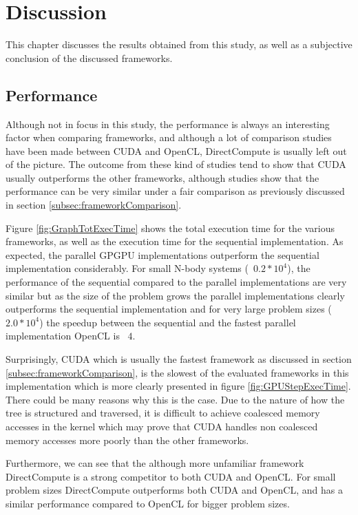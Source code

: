 
\chapter{Discussion}
This chapter discusses the results obtained from this study, as well as a subjective conclusion of the discussed frameworks.

\section{Performance} \label{sec:DiscussionPerformance}
Although not in focus in this study, the performance is always an interesting factor when comparing frameworks, and although a lot of comparison studies have been made between CUDA and OpenCL, DirectCompute is usually left out of the picture. The outcome from these kind of studies tend to show that CUDA usually outperforms the other frameworks, although studies show that the performance can be very similar under a fair comparison as previously discussed in section \ref{subsec:frameworkComparison}.

Figure \ref{fig:GraphTotExecTime} shows the total execution time for the various frameworks, as well as the execution time for the sequential implementation. As expected, the parallel GPGPU implementations outperform the sequential implementation considerably. For small N-body systems (~$0.2*10^4$), the performance of the sequential compared to the parallel implementations are very similar but as the size of the problem grows the parallel implementations clearly outperforms the sequential implementation and for very large problem sizes (~$2.0*10^4$) the speedup between the sequential and the fastest parallel implementation OpenCL is ~$4$. 

Surprisingly, CUDA which is usually the fastest framework as discussed in section \ref{subsec:frameworkComparison}, is the slowest of the evaluated frameworks in this implementation which is more clearly presented in figure \ref{fig:GPUStepExecTime}. There could be many reasons why this is the case. Due to the nature of how the tree is structured and traversed, it is difficult to achieve coalesced memory accesses in the kernel which may prove that CUDA handles non coalesced memory accesses more poorly than the other frameworks. 

Furthermore, we can see that the although more unfamiliar framework DirectCompute is a strong competitor to both CUDA and OpenCL. For small problem sizes DirectCompute outperforms both CUDA and OpenCL, and has a similar performance compared to OpenCL for bigger problem sizes. 

